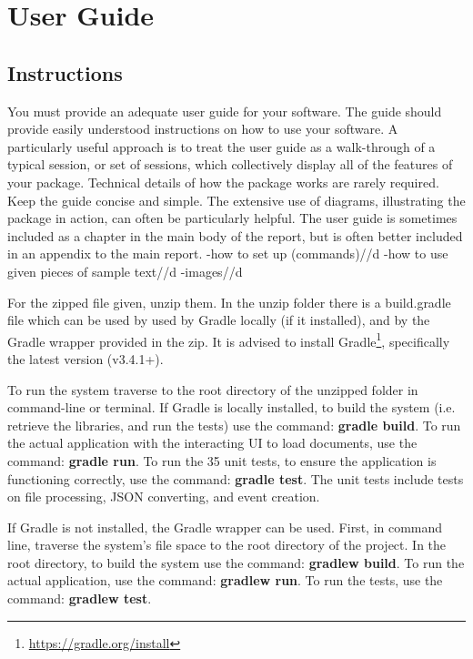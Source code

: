 \chapter{User Guide}
\section{Instructions}
You must provide an adequate user guide for your software. The guide should provide easily understood instructions on how to use your software. A particularly useful approach is to treat the user guide as a walk-through of a typical session, or set of sessions, which collectively display all of the features of your package. Technical details of how the package works are rarely required. Keep the guide concise and simple. The extensive use of diagrams, illustrating the package in action, can often be particularly helpful. The user guide is sometimes included as a chapter in the main body of the report, but is often better included in an appendix to the main report.
-how to set up (commands)//d
-how to use given pieces of sample text//d
-images//d

\par For the zipped file given, unzip them. In the unzip folder there is a build.gradle file which can be used by used by Gradle locally (if it installed), and by the Gradle wrapper provided in the zip. It is advised to install Gradle\footnote{\url{https://gradle.org/install}}, specifically the latest version (v3.4.1+).

\par To run the system traverse to the root directory of the unzipped folder in command-line or terminal. If Gradle is locally installed, to build the system (i.e. retrieve the libraries, and run the tests) use the command: \textbf{gradle build}. To run the actual application with the interacting UI to load documents, use the command: \textbf{gradle run}. To run the 35 unit tests, to ensure the application is functioning correctly, use the command: \textbf{gradle test}. The unit tests include tests on file processing, JSON converting, and event creation.

\par If Gradle is not installed, the Gradle wrapper can be used. First, in command line, traverse the system's file space to the root directory of the project. In the root directory, to build the system use the command: \textbf{gradlew build}. To run the actual application, use the command: \textbf{gradlew run}. To run the tests, use the command: \textbf{gradlew test}.

